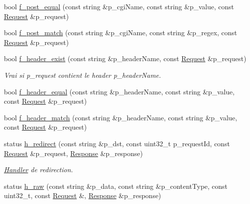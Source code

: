 \begin{DoxyCompactItemize}
bool \hyperlink{classxtd_1_1network_1_1http_1_1Server_aa9b902188ce45e96f65fc53a20ff06ce}{f\-\_\-post\-\_\-equal} (const string \&p\-\_\-cgi\-Name, const string \&p\-\_\-value, const \hyperlink{classxtd_1_1network_1_1http_1_1Request}{Request} \&p\-\_\-request)
\item 
bool \hyperlink{classxtd_1_1network_1_1http_1_1Server_ad343ecdd51be8e982a37cd6fa4ee55ac}{f\-\_\-post\-\_\-match} (const string \&p\-\_\-cgi\-Name, const string \&p\-\_\-regex, const \hyperlink{classxtd_1_1network_1_1http_1_1Request}{Request} \&p\-\_\-request)
\item 
bool \hyperlink{classxtd_1_1network_1_1http_1_1Server_a5994c8b6d70b220ded5ab33a73b3295f}{f\-\_\-header\-\_\-exist} (const string \&p\-\_\-header\-Name, const \hyperlink{classxtd_1_1network_1_1http_1_1Request}{Request} \&p\-\_\-request)
\begin{DoxyCompactList}\small\item\em Vrai si p\-\_\-request contient le header p\-\_\-header\-Name. \end{DoxyCompactList}\item 
bool \hyperlink{classxtd_1_1network_1_1http_1_1Server_a3216fa7e19f62235f9988b681f33a06d}{f\-\_\-header\-\_\-equal} (const string \&p\-\_\-header\-Name, const string \&p\-\_\-value, const \hyperlink{classxtd_1_1network_1_1http_1_1Request}{Request} \&p\-\_\-request)
\item 
bool \hyperlink{classxtd_1_1network_1_1http_1_1Server_a60788c00e470ed21293129be27e7115c}{f\-\_\-header\-\_\-match} (const string \&p\-\_\-header\-Name, const string \&p\-\_\-value, const \hyperlink{classxtd_1_1network_1_1http_1_1Request}{Request} \&p\-\_\-request)
\item 
status \hyperlink{classxtd_1_1network_1_1http_1_1Server_a7019a45601be34deed0a321a6be66cbf}{h\-\_\-redirect} (const string \&p\-\_\-dst, const uint32\-\_\-t p\-\_\-request\-Id, const \hyperlink{classxtd_1_1network_1_1http_1_1Request}{Request} \&p\-\_\-request, \hyperlink{classxtd_1_1network_1_1http_1_1Response}{Response} \&p\-\_\-response)
\begin{DoxyCompactList}\small\item\em \hyperlink{classxtd_1_1network_1_1http_1_1Server_1_1Handler}{Handler} de redirection. \end{DoxyCompactList}\item 
status \hyperlink{classxtd_1_1network_1_1http_1_1Server_afa9cd0274280f47c74fe27ab4e2bfe38}{h\-\_\-raw} (const string \&p\-\_\-data, const string \&p\-\_\-content\-Type, const uint32\-\_\-t, const \hyperlink{classxtd_1_1network_1_1http_1_1Request}{Request} \&, \hyperlink{classxtd_1_1network_1_1http_1_1Response}{Response} \&p\-\_\-response)

\end{DoxyCompactItemize}
